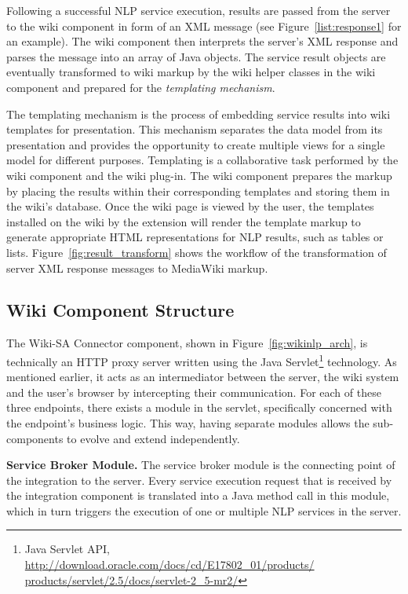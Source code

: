 Following a successful NLP service execution, results are passed from the \sa server to the wiki component in form of an XML message (see Figure~\ref{list:response1} for an example). The wiki component then interprets the server's XML response and parses the message into an array of Java objects. The service result objects are eventually transformed to wiki markup by the wiki helper classes in the wiki component and prepared for the \emph{templating mechanism}. 

The templating mechanism is the process of embedding service results into wiki templates for presentation. This mechanism separates the data model from its presentation and provides the opportunity to create multiple views for a single model for different purposes. Templating is a collaborative task performed by the wiki component and the wiki plug-in. The wiki component prepares the markup by placing the results within their corresponding templates and storing them in the wiki's database. Once the wiki page is viewed by the user, the templates installed on the wiki by the \sa extension will render the template markup to generate appropriate HTML representations for NLP results, such as tables or lists. Figure~\ref{fig:result_transform} shows the workflow of the transformation of server XML response messages to MediaWiki markup.

\subsection{Wiki Component Structure}
The Wiki-SA Connector component, shown in Figure~\ref{fig:wikinlp_arch}, is technically an HTTP proxy server written using the Java Servlet\footnote{Java Servlet API, \url{http://download.oracle.com/docs/cd/E17802_01/products/ products/servlet/2.5/docs/servlet-2_5-mr2/}} technology. As mentioned earlier, it acts as an intermediator between the \sa server, the wiki system and the user's browser by intercepting their communication. For each of these three endpoints, there exists a module in the servlet, specifically concerned with the endpoint's business logic. This way, having separate modules allows the sub-components to evolve and extend independently.

\blankline
\noindent
\textbf{Service Broker Module. }{The service broker module is the connecting point of the integration to the \sa server. Every service execution request that is received by the integration component is translated into a Java method call in this module, which in turn triggers the execution of one or multiple NLP services in the \sa server.}

